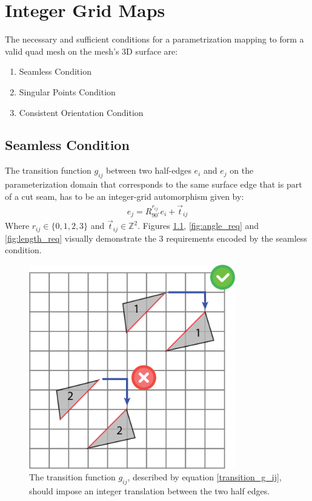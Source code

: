 \chapter{Integer Grid Maps}
The necessary and sufficient conditions for a parametrization mapping to form a valid quad mesh on the mesh's 3D surface are:
\begin{enumerate}
\item Seamless Condition
\item Singular Points Condition
\item Consistent Orientation Condition
\end{enumerate}

\section{Seamless Condition}
The transition function $g_{ij}$ between two half-edges $e_i$ and $e_j$ on the parameterization domain that corresponds to the same surface edge that is part of a cut seam, has to be an integer-grid automorphism given by:
\begin{equation}\label{transition_g_ij}
\begin{split}
e_j = R^{r_{ij}}_{90^\circ}e_i + \vec{t}_{ij}
\end{split}
\end{equation}
Where  $r_{ij} \in \{0,1,2,3\}$ and $\vec{t}_{ij} \in \mathbb{Z}^2$. Figures \ref{fig:translation_req}, \ref{fig:angle_req} and \ref{fig:length_req} visually demonstrate the 3 requirements encoded by the seamless condition.
  
\begin{figure}[ht]
\centering
\includegraphics[width=9cm]{figures/seamless/translation.png}
\caption[The Translation Requirement]{The transition function $g_{ij}$, described by equation \ref{transition_g_ij}, should impose an integer translation between the two half edges.}
\label{fig:translation_req}
\end{figure}

